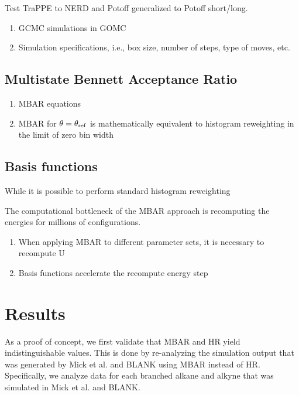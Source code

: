 \documentclass[11pt,a4paper]{article}
\begin{document}
Test TraPPE to NERD and Potoff generalized to Potoff short/long.

\begin{enumerate}
	\item GCMC simulations in GOMC
	\item Simulation specifications, i.e., box size, number of steps, type of moves, etc.
\end{enumerate}

\subsection{Multistate Bennett Acceptance Ratio}

\begin{enumerate}
	\item MBAR equations
	\item MBAR for $\theta = \theta_{\rm ref}$ is mathematically equivalent to histogram reweighting in the limit of zero bin width
\end{enumerate}

\subsection{Basis functions}

While it is possible to perform standard histogram reweighting 

The computational bottleneck of the MBAR approach is recomputing the energies for millions of configurations. 

\begin{enumerate}
	\item When applying MBAR to different parameter sets, it is necessary to recompute U
	\item Basis functions accelerate the recompute energy step
\end{enumerate}

\section{Results}

As a proof of concept, we first validate that MBAR and HR yield indistinguishable values. This is done by re-analyzing the simulation output that was generated by Mick et al. and BLANK using MBAR instead of HR. Specifically, we analyze data for each branched alkane and alkyne that was simulated in Mick et al. and BLANK.  
\end{document}
